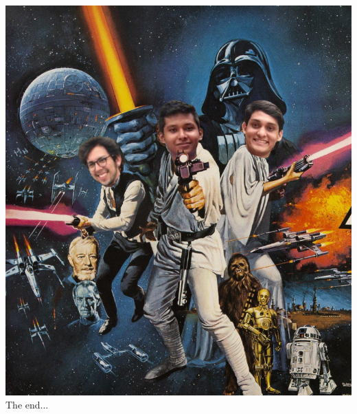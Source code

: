 \documentclass{article}
\begin{document}
  

  

  \centering
  \includegraphics[width=17cm]{A New Hope.png} \\
  {\Huge The end...\\}
  
\end{document}
